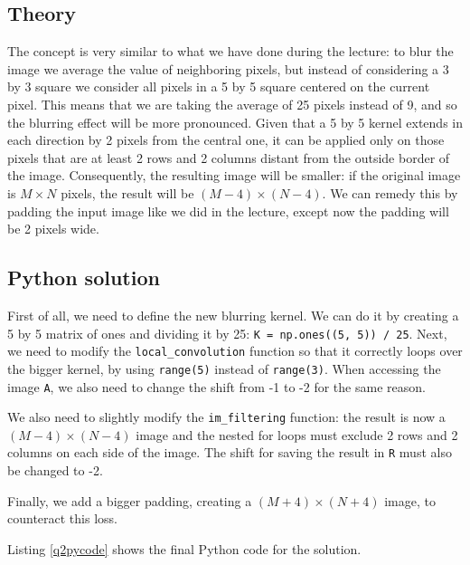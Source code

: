 \documentclass{article}
\newcommand{\py}[1]{\texttt{\lstinline!#1!}}
\begin{document}
\subsection{Theory}
The concept is very similar to what we have done during the lecture: to blur the image we average the value of neighboring pixels, but instead of considering a 3 by 3 square we consider all pixels in a 5 by 5 square centered on the current pixel. This means that we are taking the average of 25 pixels instead of 9, and so the blurring effect will be more pronounced.
Given that a 5 by 5 kernel extends in each direction by 2 pixels from the central one, it can be applied only on those pixels that are at least 2 rows and 2 columns distant from the outside border of the image. Consequently, the resulting image will be smaller: if the original image is $M \times N$ pixels, the result will be $(M-4) \times (N-4)$. We can remedy this by padding the input image like we did in the lecture, except now the padding will be 2 pixels wide.

\subsection{Python solution}
First of all, we need to define the new blurring kernel. We can do it by creating a 5 by 5 matrix of ones and dividing it by 25: \py{K = np.ones((5, 5)) / 25}.
Next, we need to modify the \py{local_convolution} function so that it correctly loops over the bigger kernel, by using \py{range(5)} instead of \py{range(3)}. When accessing the image \py{A}, we also need to change the shift from -1 to -2 for the same reason.

We also need to slightly modify the \py{im_filtering} function: the result is now a $(M-4) \times (N-4)$ image and the nested for loops must exclude 2 rows and 2 columns on each side of the image. The shift for saving the result in \py{R} must also be changed to -2.

Finally, we add a bigger padding, creating a $(M+4) \times (N+4)$ image, to counteract this loss.

Listing \ref{q2pycode} shows the final Python code for the solution.

\end{document}
